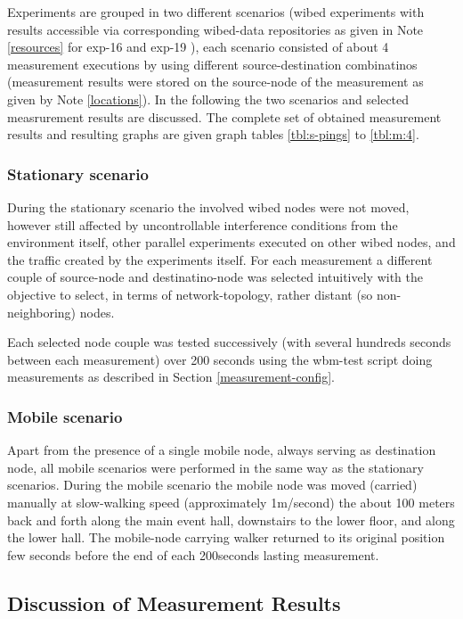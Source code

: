 \documentclass[a4paper,12pt,twoside]{article}
\begin{document}
Experiments are grouped in two different scenarios (wibed experiments
with results accessible via corresponding wibed-data repositories as
given in Note \ref{resources} for exp-16 and exp-19 ), each scenario
consisted of about 4 measurement executions by using different
source-destination combinatinos (measurement results were stored on
the source-node of the measurement as given by Note \ref{locations}).
In the following the two scenarios and selected measrurement results
are discussed.  The complete set of obtained measurement results and
resulting graphs are given graph tables \ref{tbl:s-pings} to
\ref{tbl:m:4}.

\subsubsection{Stationary scenario}

During the stationary scenario the involved wibed nodes were not
moved, however still affected by uncontrollable interference
conditions from the environment itself, other parallel experiments
executed on other wibed nodes, and the traffic created by the
experiments itself. For each measurement a different couple of
source-node and destinatino-node was selected intuitively with the
objective to select, in terms of network-topology, rather distant
(so non-neighboring) nodes.

Each selected node couple was tested successively (with several
hundreds seconds between each measurement) over 200 seconds using the
wbm-test script \cite{wbm-test} doing measurements as described in
Section \ref{measurement-config}.

\subsubsection{Mobile scenario}

Apart from the presence of a single mobile node, always serving as
destination node, all mobile scenarios were performed in the same way
as the stationary scenarios. During the mobile scenario the mobile
node was moved (carried) manually at slow-walking speed (approximately
1m/second) the about 100 meters back and forth along the main event
hall, downstairs to the lower floor, and along the lower hall.  The
mobile-node carrying walker returned to its original position few
seconds before the end of each 200seconds lasting measurement.


\subsection{Discussion of Measurement Results}
\end{document}
